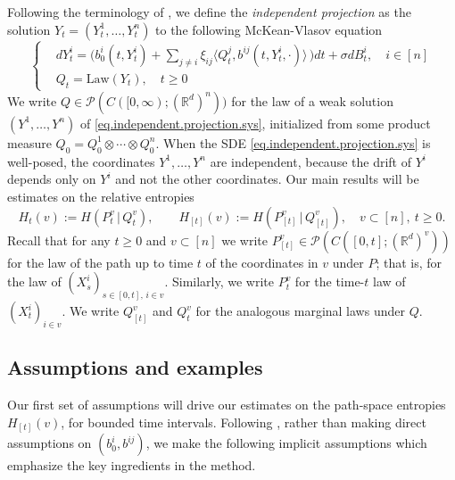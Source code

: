 \documentclass[11pt,reqno]{amsart}
\numberwithin{equation}{section}
\theoremstyle{definition}
\def\P{{\mathcal P}}
\def\R{{\mathbb R}}
\begin{document}
Following the terminology of  \cite{lacker2023independent}, we define the \emph{independent projection} as the solution $Y_t=(Y^1_t,\ldots,Y^n_t)$ to the following McKean-Vlasov equation
	\begin{equation}
		\left\{\begin{aligned}
			 \label{eq.independent.projection.sys}
			&d Y^{i}_t =  \Big(b_0^i(t, Y^{i}_t) +  \sum_{j \neq i} \xi_{ij} \langle Q^j_t, b^{ij}(t, Y^{i}_t, \cdot)\rangle \,  \Big) dt + \sigma dB^i_t, \quad i \in [n] \\
			& Q_t = \mathrm{Law}(Y_t), \quad t\ge 0
		\end{aligned}\right.
	\end{equation} 
We write $ Q \in \P( C([0,\infty);(\R^d)^n) )$ for the law of a weak solution $ (Y^1, \ldots, Y^n) $ of \eqref{eq.independent.projection.sys}, initialized from some product measure $Q_0=Q^1_0 \otimes \cdots \otimes Q^n_0$. When the SDE \eqref{eq.independent.projection.sys} is well-posed, the coordinates $Y^1,\ldots,Y^n$ are independent, because the drift of $Y^i$ depends only on $Y^i$ and not the other coordinates.
Our main results will be estimates on the relative entropies 
\begin{equation}
H_t(v) := H(P^{v}_t \, | \, Q^{v}_t), \qquad H_{[t]}(v) := H(P^{v}_{[t]} \, | \, Q^{v}_{[t]}), \quad v \subset [n], \ t \ge 0. \label{def:entropies}
\end{equation}
Recall that for any  $t \ge 0$ and $v \subset [n]$ we write $P^{v}_{[t]} \in \P(C([0,t];(\R^d)^v))$ for the law of the path up to time $t$ of the coordinates in $v$ under $P$; that is, for the law of $(X^i_s)_{s \in [0,t], \, i \in v}$. Similarly, we write $P^v_t$ for the time-$t$ law of $(X^i_t)_{i \in v}$. We write $Q^v_{[t]}$ and $Q^v_t$ for the analogous marginal laws under $Q$.



\subsection{Assumptions and examples}

Our first set of assumptions will drive our estimates on the path-space entropies $H_{[t]}(v)$, for bounded time intervals.
Following \cite{lacker2022hierarchies}, rather than making direct assumptions on $(b_0^i,b^{ij})$, we make the following implicit assumptions which emphasize the key ingredients in the method.
\end{document}
